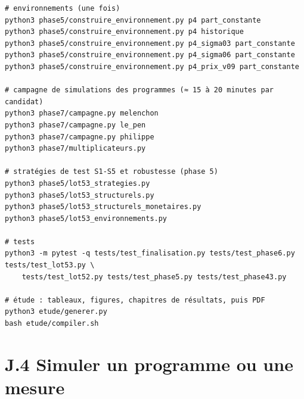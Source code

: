 \documentclass[
  11pt,
  11pt,
  a4paper,
  openany]{book}
\begin{document}
\begin{verbatim}
# environnements (une fois)
python3 phase5/construire_environnement.py p4 part_constante
python3 phase5/construire_environnement.py p4 historique
python3 phase5/construire_environnement.py p4_sigma03 part_constante
python3 phase5/construire_environnement.py p4_sigma06 part_constante
python3 phase5/construire_environnement.py p4_prix_v09 part_constante

# campagne de simulations des programmes (≈ 15 à 20 minutes par candidat)
python3 phase7/campagne.py melenchon
python3 phase7/campagne.py le_pen
python3 phase7/campagne.py philippe
python3 phase7/multiplicateurs.py

# stratégies de test S1-S5 et robustesse (phase 5)
python3 phase5/lot53_strategies.py
python3 phase5/lot53_structurels.py
python3 phase5/lot53_structurels_monetaires.py
python3 phase5/lot53_environnements.py

# tests
python3 -m pytest -q tests/test_finalisation.py tests/test_phase6.py tests/test_lot53.py \
    tests/test_lot52.py tests/test_phase5.py tests/test_phase43.py

# étude : tableaux, figures, chapitres de résultats, puis PDF
python3 etude/generer.py
bash etude/compiler.sh
\end{verbatim}

\hypertarget{j.4-simuler-un-programme-ou-une-mesure}{%
\section{J.4 Simuler un programme ou une
mesure}\label{j.4-simuler-un-programme-ou-une-mesure}}
\end{document}
